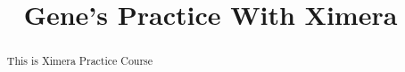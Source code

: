 \documentclass{xourse}
\title{Gene's Practice With Ximera}
\begin{document}
  
\begin{abstract} %
This is Ximera Practice Course 
\end{abstract}  
\maketitle  
 
 
\end{document}
